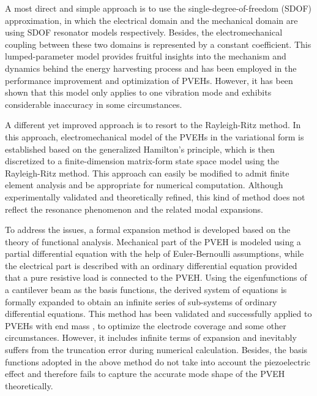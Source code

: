 \documentclass{article}
\begin{document}
A most direct and simple approach is to use the single-degree-of-freedom (SDOF) approximation, in which the electrical domain and the mechanical domain are using SDOF resonator models respectively. Besides, the electromechanical coupling between these two domains is represented by a constant coefficient. \cite{roundy2003study,dutoit2005design} This lumped-parameter model provides fruitful insights into the mechanism and dynamics behind the energy harvesting process and has been employed in the performance improvement and optimization of PVEHs. \cite{stephen2006energy,cottone2009nonlinear} However, it has been shown that this model only applies to one vibration mode and exhibits considerable inaccuracy in some circumstances. \cite{erturk2008mechanical}

A different yet improved approach is to resort to the Rayleigh-Ritz method. In this approach, electromechanical model of the PVEHs in the variational form is established based on the generalized Hamilton's principle, \cite{crandall1968dynamics} which is then discretized to a finite-dimension matrix-form state space model using the Rayleigh-Ritz method. \cite{hagood1990modelling} This approach can easily be modified to admit finite element analysis and be appropriate for numerical computation. Although experimentally validated and theoretically refined, \cite{sodano2004estimation,lu2003modeling,chen2006analytical,ajitsaria2007modeling} this kind of method does not reflect the resonance phenomenon and the related modal expansions. 

To address the issues, a formal expansion method is developed based on the theory of functional analysis. \cite{kreyszig1978introductory} Mechanical part of the PVEH is modeled using a partial differential equation with the help of Euler-Bernoulli assumptions, while the electrical part is described with an ordinary differential equation provided that a pure resistive load is connected to the PVEH. \cite{erturk2008distributed} Using the eigenfunctions of a cantilever beam as the basis functions, the derived system of equations is formally expanded to obtain an infinite series of sub-systems of ordinary differential equations. This method has been validated and successfully applied to PVEHs with end mass \cite{erturk2009experimentally}, to optimize the electrode coverage \cite{erturk2009effect} and some other circumstances. However, it includes infinite terms of expansion and inevitably suffers from the truncation error during numerical calculation. Besides, the basis functions adopted in the above method do not take into account the piezoelectric effect and therefore fails to capture the accurate mode shape of the PVEH theoretically.
\end{document}
